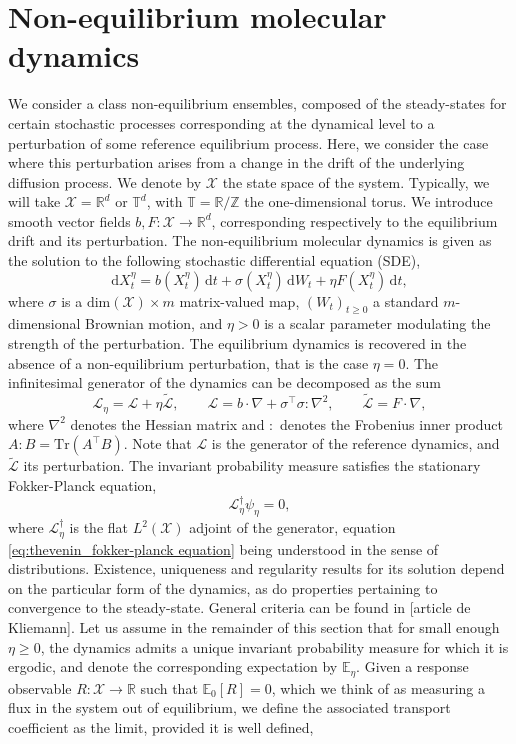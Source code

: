 \documentclass[pdflatex,sn-mathphys]{sn-jnl}%
\theoremstyle{thmstyleone}%
\theoremstyle{thmstyletwo}%
\theoremstyle{thmstylethree}%
\renewcommand{\d}{\mathrm{d}}
\newcommand{\cL}{\mathcal{L}}
\newcommand{\1}{\mathbbm{1}}
\newcommand{\Xeta}{X^\eta}
\begin{document}
\section{Non-equilibrium molecular dynamics}\label{nemd}
We consider a class non-equilibrium ensembles, composed of the steady-states for certain stochastic processes corresponding at the dynamical level to a perturbation of some reference equilibrium process.
Here, we consider the case where this perturbation arises from a change in the drift of the underlying diffusion process. We denote by $\mathcal X$ the state space of the system.
Typically, we will take $\mathcal X= \mathbb{R}^d$ or $\mathbb{T}^d$, with $\mathbb{T}= \mathbb{R}/\mathbb{Z}$ the one-dimensional torus. We introduce smooth vector fields $b,F: \mathcal{X}\to \mathbb{R}^d$, corresponding respectively to the equilibrium drift and its perturbation.
The non-equilibrium molecular dynamics is given as the solution to the following stochastic differential equation (SDE),
\begin{equation}
    \label{eq:thevenin_dynamics}
    \d \Xeta_t = b(\Xeta_t)\,\d t +\sigma(\Xeta_t)\,\d W_t +\eta F(\Xeta_t)\,\d t,
\end{equation}
where $\sigma$ is a $\mathrm{dim}(\mathcal X)\times m$ matrix-valued map, $(W_t)_{t\geq 0}$ a standard $m$-dimensional Brownian motion, and $\eta>0$ is a scalar parameter modulating the strength of the perturbation.
The equilibrium dynamics is recovered in the absence of a non-equilibrium perturbation, that is the case $\eta=0$.
The infinitesimal generator of the dynamics can be decomposed as the sum
\begin{equation}
    \label{eq:thevenin_generator}\cL_\eta=\cL+\eta \widetilde{\cL},\qquad \cL=b \cdot \nabla + \sigma ^\intercal \sigma : \nabla ^2,\qquad \widetilde{\cL}=F\cdot \nabla,
\end{equation}
where $\nabla^2$ denotes the Hessian matrix and $:$ denotes the Frobenius inner product $A:B=\mathrm{Tr}(A^\intercal B)$. 
Note that $\cL$ is the generator of the reference dynamics, and $\widetilde{\cL}$ its perturbation.
The invariant probability measure satisfies the stationary Fokker-Planck equation,
\begin{equation}
    \label{eq:thevenin_fokker-planck equation}
    \cL_\eta^{\dagger} \psi_\eta = 0,
\end{equation}
where $\cL_\eta^{\dagger}$ is the flat $L^2(\mathcal X)$ adjoint of the generator, equation \eqref{eq:thevenin_fokker-planck equation} being understood in the sense of distributions. Existence, uniqueness and regularity results for its solution depend on the particular form of the dynamics, as do properties pertaining to convergence to the steady-state. General criteria can be found in [article de Kliemann]. Let us assume in the remainder of this section that for small enough $\eta \geq 0$, the dynamics admits a unique invariant probability measure for which it is ergodic, and denote the corresponding expectation by $\mathbb{E}_\eta$. Given a response observable $R : \mathcal X \to \mathbb R$ such that $\mathbb{E}_0\left[ R\right]=0$, which we think of as measuring a flux in the system out of equilibrium, we define the associated transport coefficient as the limit, provided it is well defined,
\end{document}
